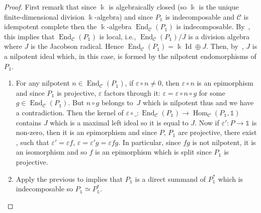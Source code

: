\documentclass[pdftex]{sigma}
\numberwithin{equation}{section}
\newcommand{\tto}{\xrightarrow}
\numberwithin{theorem}{section}
\numberwithin{proposition}{section}
\numberwithin{definition}{section}
\numberwithin{lemma}{section}
\numberwithin{corollary}{section}
\numberwithin{remark}{section}
\numberwithin{example}{section}
\newcommand{\cat}{\mathcal{C}}
\newcommand{\End}{\operatorname{End}}
\newcommand{\Hom}{\operatorname{Hom}}
\newcommand{\unit}{\ensuremath{\mathds{1}}}
\newcommand{\Id}{\operatorname{Id}}
\newcommand{\FK}{{\Bbbk}}
\newcommand{\ve}{\varepsilon}
\begin{document}
\begin{proof}
 First remark that since $\FK$ is algebraically closed (so
 $\FK$ is the unique finite-dimensional division $\FK$-algebra) and
 since $P_\unit$ is indecomposable
 and $\cat$ is idempotent complete then the $\FK$-algebra
 $\End_\cat(P_\unit)$ is indecomposable. By~\cite[Theorem~3.2.2]{DK94},
 this implies that $\End_\cat(P_\unit)$ is local, i.e.,
 $\End_\cat(P_\unit)/J$ is a division algebra where $J$ is the
 Jacobson radical. Hence $\End_\cat(P_\unit)=\FK\Id\oplus J$. Then,
 by~\cite[Proposition 3.1.9]{DK94}, $J$ is a nilpotent ideal which,
 in this case, is formed by the nilpotent endomorphisms of $P_\unit$.
 \begin{enumerate}\itemsep=0pt
 \item For any nilpotent $n\in\End_\cat(P_\unit)$, if
 $\ve\circ n\neq 0$, then $\ve\circ n$ is an epimorphism and since
 $P_\unit$ is projective, $\ve$ factors through it:
 $\ve=\ve\circ n\circ g$ for some $g\in\End_\cat(P_\unit)$. But
 $n\circ g$ belongs to~$J$ which is nilpotent thus
 \smash{$\ve=\ve\circ(n\circ g)^{\dim_\FK(J)}=0$}
 and we have a contradiction. Then the kernel of
 $\ve\circ\_
 \colon \End_\cat(P_\unit)\to\Hom_\cat(P_\unit,\unit)$
 contains $J$ which is a maximal left
 ideal so it is equal to $J$. Now if $\ve'\colon P\to\unit$ is non-zero, then it is an epimorphism and since $P$, $P_\unit$ are
 projective, there exist \smash{$P\tto fP_\unit$}, \smash{$P_\unit\tto gP$} such that
 $\ve'=\ve f$, $\ve=\ve'g=\ve fg$. In particular, since $fg$ is not
 nilpotent, it is an isomorphism and so $f$ is an epimorphism which
 is split since $P_\unit$ is projective.

 \item Apply the previous to \smash{$P_\unit^*\tto{\eta^*}\unit$} implies
 that $P_\unit$ is a direct summand of $P_\unit^*$ which is
 indecomposable so $P_\unit\simeq P_\unit^*$.


\end{enumerate}
\end{proof}
\end{document}
